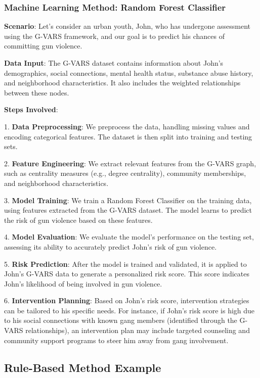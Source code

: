 \documentclass[11pt]{article}
\begin{document}
\subsubsection*{Machine Learning Method: Random Forest Classifier}

\textbf{Scenario}: Let's consider an urban youth, John, who has undergone assessment using the \textsf{G-VARS} framework, and our goal is to predict his chances of committing gun violence.

\textbf{Data Input}: The \textsf{G-VARS} dataset contains information about John's demographics, social connections, mental health status, substance abuse history, and neighborhood characteristics. It also includes the weighted relationships between these nodes.

\noindent\textbf{Steps Involved}:

1. \textbf{Data Preprocessing}: We preprocess the data, handling missing values and encoding categorical features. The dataset is then split into training and testing sets.

2. \textbf{Feature Engineering}: We extract relevant features from the \textsf{G-VARS} graph, such as centrality measures (e.g., degree centrality), community memberships, and neighborhood characteristics.

3. \textbf{Model Training}: We train a Random Forest Classifier on the training data, using features extracted from the \textsf{G-VARS} dataset. The model learns to predict the risk of gun violence based on these features.

4. \textbf{Model Evaluation}: We evaluate the model's performance on the testing set, assessing its ability to accurately predict John's risk of gun violence.

5. \textbf{Risk Prediction}: After the model is trained and validated, it is applied to John's \textsf{G-VARS} data to generate a personalized risk score. This score indicates John's likelihood of being involved in gun violence.

6. \textbf{Intervention Planning}: Based on John's risk score, intervention strategies can be tailored to his specific needs. For instance, if John's risk score is high due to his social connections with known gang members (identified through the \textsf{G-VARS} relationships), an intervention plan may include targeted counseling and community support programs to steer him away from gang involvement.

\subsection{Rule-Based Method Example}
\end{document}
